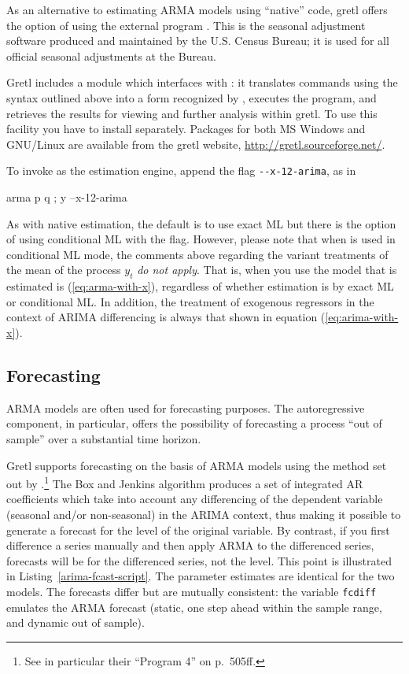 As an alternative to estimating ARMA models using ``native'' code,
gretl offers the option of using the external program
.  This is the seasonal adjustment software produced
and maintained by the U.S. Census Bureau; it is used for all official
seasonal adjustments at the Bureau.

Gretl includes a module which interfaces with :
it translates  commands using the syntax outlined above into
a form recognized by , executes the program, and
retrieves the results for viewing and further analysis within
gretl.  To use this facility you have to install
 separately.  Packages for both MS Windows and
GNU/Linux are available from the gretl website,
\url{http://gretl.sourceforge.net/}.

To invoke  as the estimation engine, append the flag
\verb|--x-12-arima|, as in
\begin{code}
arma p q ; y --x-12-arima
\end{code}
As with native estimation, the default is to use exact ML but there is
the option of using conditional ML with the  flag.
However, please note that when  is used in conditional
ML mode, the comments above regarding the variant treatments of the
mean of the process $y_t$ \textit{do not apply}.  That is, when you
use  the model that is estimated is
(\ref{eq:arma-with-x}), regardless of whether estimation is by exact
ML or conditional ML.  In addition, the treatment of exogenous
regressors in the context of ARIMA differencing is always that shown
in equation (\ref{eq:arima-with-x}).


\subsection{Forecasting}
\label{arma-fcast}

ARMA models are often used for forecasting purposes.  The
autoregressive component, in particular, offers the possibility of
forecasting a process ``out of sample'' over a substantial time
horizon.

Gretl supports forecasting on the basis of ARMA models using the
method set out by \cite{box-jenkins76}.\footnote{See in particular
  their ``Program 4'' on p.\ 505ff.}  The Box and Jenkins algorithm
produces a set of integrated AR coefficients which take into account
any differencing of the dependent variable (seasonal and/or
non-seasonal) in the ARIMA context, thus making it possible to
generate a forecast for the level of the original variable.  By
contrast, if you first difference a series manually and then apply
ARMA to the differenced series, forecasts will be for the differenced
series, not the level.  This point is illustrated
in Listing~\ref{arima-fcast-script}.  The parameter estimates are identical
for the two models.  The forecasts differ but are mutually consistent:
the variable \texttt{fcdiff} emulates the ARMA forecast (static,
one step ahead within the sample range, and dynamic out of sample).

